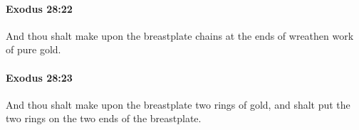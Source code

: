 		\paragraph{Exodus 28:22} %
			\label{EXODUS-28-22}

			And thou shalt make upon the breastplate chains at the ends of wreathen work of pure gold.


		\paragraph{Exodus 28:23} %
			\label{EXODUS-28-23}

			And thou shalt make upon the breastplate two rings of gold, and shalt put the two rings on the two ends of the breastplate.


